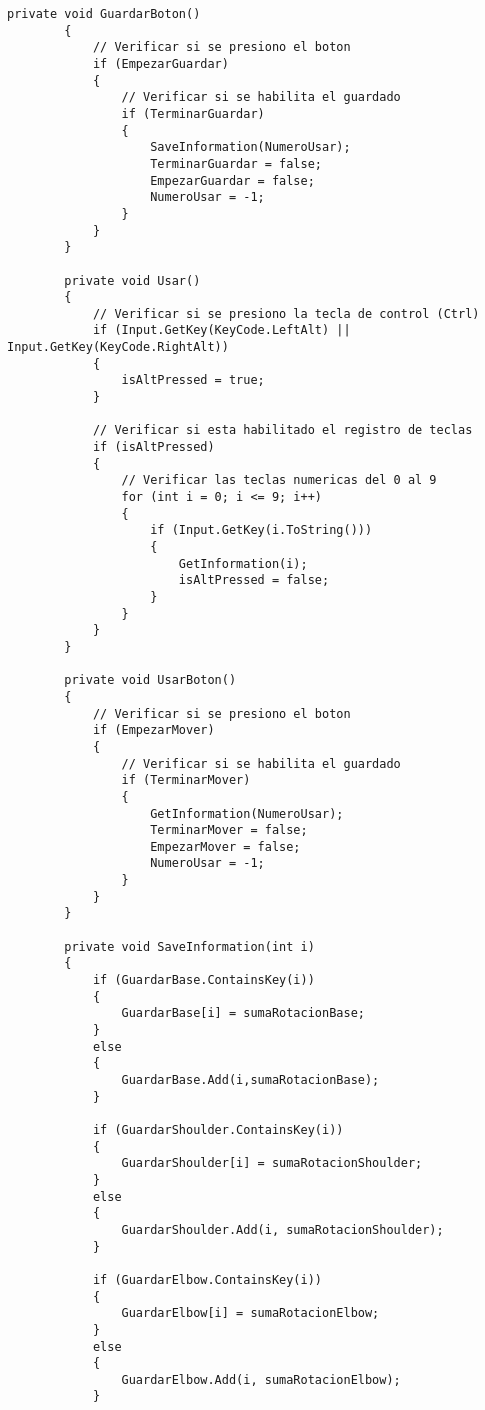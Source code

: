 \begin{lstlisting}[frame=single]
        private void GuardarBoton()
        {
            // Verificar si se presiono el boton
            if (EmpezarGuardar)
            {
                // Verificar si se habilita el guardado
                if (TerminarGuardar)
                {
                    SaveInformation(NumeroUsar);
                    TerminarGuardar = false;
                    EmpezarGuardar = false;
                    NumeroUsar = -1;
                }
            }     
        }
    
        private void Usar()
        {
            // Verificar si se presiono la tecla de control (Ctrl)
            if (Input.GetKey(KeyCode.LeftAlt) || Input.GetKey(KeyCode.RightAlt))
            {
                isAltPressed = true;
            }
    
            // Verificar si esta habilitado el registro de teclas
            if (isAltPressed)
            {
                // Verificar las teclas numericas del 0 al 9
                for (int i = 0; i <= 9; i++)
                {
                    if (Input.GetKey(i.ToString()))
                    {
                        GetInformation(i);
                        isAltPressed = false;
                    }
                }
            }
        }
    
        private void UsarBoton()
        {
            // Verificar si se presiono el boton
            if (EmpezarMover)
            {
                // Verificar si se habilita el guardado
                if (TerminarMover)
                {
                    GetInformation(NumeroUsar);
                    TerminarMover = false;
                    EmpezarMover = false;
                    NumeroUsar = -1;
                }
            }
        }
    
        private void SaveInformation(int i)
        {
            if (GuardarBase.ContainsKey(i))
            {
                GuardarBase[i] = sumaRotacionBase;
            }
            else
            {
                GuardarBase.Add(i,sumaRotacionBase);
            }
    
            if (GuardarShoulder.ContainsKey(i))
            {
                GuardarShoulder[i] = sumaRotacionShoulder;
            }
            else
            {
                GuardarShoulder.Add(i, sumaRotacionShoulder);
            }
    
            if (GuardarElbow.ContainsKey(i))
            {
                GuardarElbow[i] = sumaRotacionElbow;
            }
            else
            {
                GuardarElbow.Add(i, sumaRotacionElbow);
            }
    

\end{lstlisting}
